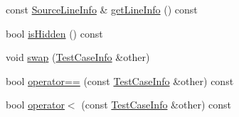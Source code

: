 \begin{DoxyCompactItemize}
const \hyperlink{structCatch_1_1SourceLineInfo}{Source\-Line\-Info} \& \hyperlink{classCatch_1_1TestCaseInfo_a1804e87bb9376479ac7c33b0d52f4a50}{get\-Line\-Info} () const 
\item 
bool \hyperlink{classCatch_1_1TestCaseInfo_a01ac8b11d8c105e5278a239ab5214257}{is\-Hidden} () const 
\item 
void \hyperlink{classCatch_1_1TestCaseInfo_a52f4e704818e3c1f93c9b3f8abe1ed60}{swap} (\hyperlink{classCatch_1_1TestCaseInfo}{Test\-Case\-Info} \&other)
\item 
bool \hyperlink{classCatch_1_1TestCaseInfo_a3007b667cc1ef9b173ea80cb068a1758}{operator==} (const \hyperlink{classCatch_1_1TestCaseInfo}{Test\-Case\-Info} \&other) const 
\item 
bool \hyperlink{classCatch_1_1TestCaseInfo_a3d18d7554624bd10d155e42f24d95e95}{operator$<$} (const \hyperlink{classCatch_1_1TestCaseInfo}{Test\-Case\-Info} \&other) const 
\end{DoxyCompactItemize}


